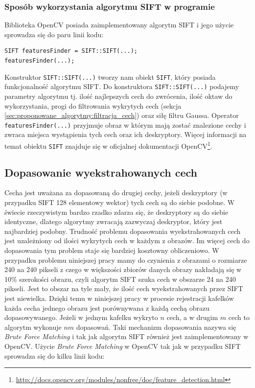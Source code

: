 \subsubsection{Sposób wykorzystania algorytmu SIFT w programie}
\label{sec:proponowane_algorytmy:sift_wykorzystanie}

Biblioteka OpenCV posiada zaimplementowany algorytm SIFT i jego użycie sprowadza się do paru linii kodu:

\begin{verbatim}
SIFT featuresFinder = SIFT::SIFT(...);
featuresFinder(...);
\end{verbatim}

Konstruktor \texttt{SIFT::SIFT(...)} tworzy nam obiekt \texttt{SIFT}, który posiada funkcjonalność algorytmu SIFT. Do konstruktora \texttt{SIFT::SIFT(...)} podajemy parametry algorytmu tj. ilość najlepszych cech do zwrócenia, ilość oktaw do wykorzystania, progi do filtrowania wykrytych cech (sekcja \ref{sec:proponowane_algorytmy:filtracja_cech}) oraz siłę filtru Gaussa. Operator \texttt{featuresFinder(...)} przyjmuje obraz w którym mają zostać znalezione cechy i zwraca miejsca wystąpienia tych cech oraz ich deskryptory. Więcej informacji na temat obiektu \texttt{SIFT} znajduje się w oficjalnej dokumentacji OpenCV\footnote{\url{http://docs.opencv.org/modules/nonfree/doc/feature_detection.html}}.

\subsection{Dopasowanie wyekstrahowanych cech}
\label{sec:proponowane_algorytmy:dopasowanie}

Cecha jest uważana za dopasowaną do drugiej cechy, jeżeli deskryptory (w przypadku SIFT 128 elementowy wektor) tych cech są do siebie podobne. W świecie rzeczywistym bardzo rzadko zdarza się, że deskryptory są do siebie identyczne, dlatego algorytmy zwracają zazwyczaj deskryptor, który jest najbardziej podobny. Trudność problemu dopasowania wyekstrahowanych cech jest uzależniony od ilości wykrytych cech w każdym z obrazów. Im więcej cech do dopasowania tym problem staje się bardziej kosztowny obliczeniowo. W przypadku problemu niniejszej pracy mamy do czynienia z obrazami o rozmiarze 240 na 240 pikseli z czego w większości zbiorów danych obrazy nakładają się w 10\% szerokości obrazu, czyli algorytm SIFT szuka cech w obszarze 24 na 240 pikseli. Jest to obszar na tyle mały, że ilość cech wyekstrahowanych przez SIFT jest niewielka. Dzięki temu w niniejszej pracy w procesie rejestracji kafelków każda cecha jednego obrazu jest porównywana z każdą cechą obrazu dopasowywanego. Jeżeli w jednym kafelku wykryto $n$ cech, a w drugim $m$ cech to algorytm wykonuje $nm$ dopasowań. Taki mechanizm dopasowania nazywa się \textit{Brute Force Matching} i tak jak algorytm SIFT również jest zaimplementowany w OpenCV. Użycie \textit{Brute Force Matching} w OpenCV tak jak w przypadku SIFT sprowadza się do kilku linii kodu:


